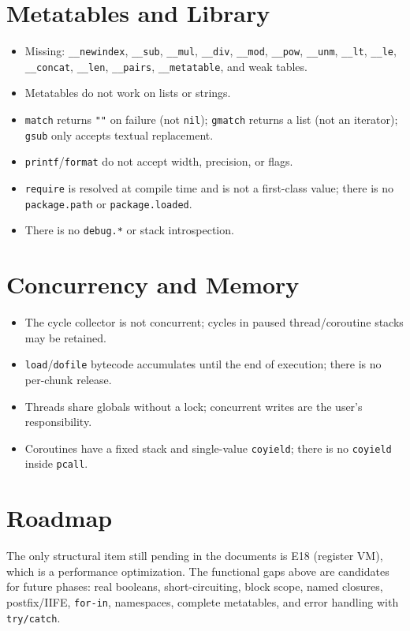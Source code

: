 \documentclass[11pt,a4paper,oneside]{report}
\newcommand{\code}[1]{\texttt{#1}}
\begin{document}
\section{Metatables and Library}
\begin{itemize}
  \item Missing: \code{\_\_newindex}, \code{\_\_sub}, \code{\_\_mul},
        \code{\_\_div}, \code{\_\_mod}, \code{\_\_pow}, \code{\_\_unm},
        \code{\_\_lt}, \code{\_\_le}, \code{\_\_concat}, \code{\_\_len},
        \code{\_\_pairs}, \code{\_\_metatable}, and weak tables.
  \item Metatables do not work on lists or strings.
  \item \code{match} returns \code{""} on failure (not \code{nil});
        \code{gmatch} returns a list (not an iterator); \code{gsub} only
        accepts textual replacement.
  \item \code{printf}/\code{format} do not accept width, precision, or
        flags.
  \item \code{require} is resolved at compile time and is not a
        first-class value; there is no \code{package.path} or
        \code{package.loaded}.
  \item There is no \code{debug.*} or stack introspection.
\end{itemize}

\section{Concurrency and Memory}
\begin{itemize}
  \item The cycle collector is not concurrent; cycles in paused
        thread/coroutine stacks may be retained.
  \item \code{load}/\code{dofile} bytecode accumulates until the end of
        execution; there is no per-chunk release.
  \item Threads share globals without a lock; concurrent writes are the
        user's responsibility.
  \item Coroutines have a fixed stack and single-value \code{coyield};
        there is no \code{coyield} inside \code{pcall}.
\end{itemize}

\section{Roadmap}
The only structural item still pending in the documents is E18 (register
VM), which is a performance optimization. The functional gaps above are
candidates for future phases: real booleans, short-circuiting, block
scope, named closures, postfix/IIFE, \code{for-in}, namespaces, complete
metatables, and error handling with \code{try/catch}.
\end{document}
